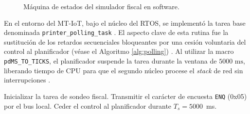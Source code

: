 \begin{figure}[htb]
\centering
{}
\caption{Máquina de estados del simulador fiscal en software.}
\label{fig:fsm_simulador}
\end{figure}

\vspace{0.5cm}

\par En el entorno del MT-IoT, bajo el núcleo del RTOS, se implementó la tarea base denominada \texttt{printer\_polling\_task} \cite{FreeRTOS_Kernel_Ref}. El aspecto clave de esta rutina fue la sustitución de los retardos secuenciales bloqueantes por una cesión voluntaria del control al planificador (véase el Algoritmo \ref{alg:polling}) \cite{FreeRTOS_Kernel_Ref}. Al utilizar la macro \texttt{pdMS\_TO\_TICKS}, el planificador suspende la tarea durante la ventana de $5000\text{ ms}$, liberando tiempo de CPU para que el segundo núcleo procese el \textit{stack} de red sin interrupciones \cite{FreeRTOS_Kernel_Ref}.

\begin{algorithm}[htbp]
\caption{Tarea de interrogación serial no bloqueante.}
\label{alg:polling}
\begin{algorithmic}[1]
\State Inicializar la tarea de sondeo fiscal.
    \State Transmitir el carácter de encuesta \texttt{ENQ} (0x05) por el bus local.
    \State Ceder el control al planificador durante $T_{s} = 5000$~ms.
\EndWhile
\end{algorithmic}
\end{algorithm}

